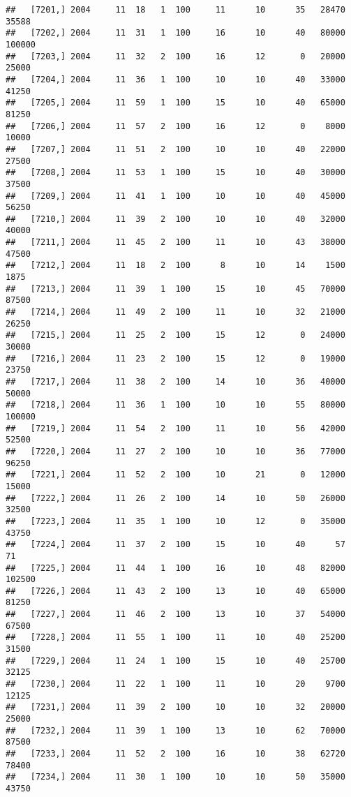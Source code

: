 \documentclass{article}\usepackage[]{graphicx}\usepackage[]{color}
\makeatletter
\newenvironment{kframe}{%
 \def\at@end@of@kframe{}%
 \ifinner\ifhmode%
  \def\at@end@of@kframe{\end{minipage}}%
  \begin{minipage}{\columnwidth}%
 \fi\fi%
 \def\FrameCommand##1{\hskip\@totalleftmargin \hskip-\fboxsep
 \colorbox{shadecolor}{##1}\hskip-\fboxsep
     \hskip-\linewidth \hskip-\@totalleftmargin \hskip\columnwidth}%
 \MakeFramed {\advance\hsize-\width
   \@totalleftmargin\z@ \linewidth\hsize
   \@setminipage}}%
 {\par\unskip\endMakeFramed%
 \at@end@of@kframe}
\newenvironment{knitrout}{}{} %
\makeatother
\begin{document}
\begin{knitrout}
\begin{kframe}
\begin{verbatim}
##   [7201,] 2004     11  18   1  100     11      10      35   28470   35588
##   [7202,] 2004     11  31   1  100     16      10      40   80000  100000
##   [7203,] 2004     11  32   2  100     16      12       0   20000   25000
##   [7204,] 2004     11  36   1  100     10      10      40   33000   41250
##   [7205,] 2004     11  59   1  100     15      10      40   65000   81250
##   [7206,] 2004     11  57   2  100     16      12       0    8000   10000
##   [7207,] 2004     11  51   2  100     10      10      40   22000   27500
##   [7208,] 2004     11  53   1  100     15      10      40   30000   37500
##   [7209,] 2004     11  41   1  100     10      10      40   45000   56250
##   [7210,] 2004     11  39   2  100     10      10      40   32000   40000
##   [7211,] 2004     11  45   2  100     11      10      43   38000   47500
##   [7212,] 2004     11  18   2  100      8      10      14    1500    1875
##   [7213,] 2004     11  39   1  100     15      10      45   70000   87500
##   [7214,] 2004     11  49   2  100     11      10      32   21000   26250
##   [7215,] 2004     11  25   2  100     15      12       0   24000   30000
##   [7216,] 2004     11  23   2  100     15      12       0   19000   23750
##   [7217,] 2004     11  38   2  100     14      10      36   40000   50000
##   [7218,] 2004     11  36   1  100     10      10      55   80000  100000
##   [7219,] 2004     11  54   2  100     11      10      56   42000   52500
##   [7220,] 2004     11  27   2  100     10      10      36   77000   96250
##   [7221,] 2004     11  52   2  100     10      21       0   12000   15000
##   [7222,] 2004     11  26   2  100     14      10      50   26000   32500
##   [7223,] 2004     11  35   1  100     10      12       0   35000   43750
##   [7224,] 2004     11  37   2  100     15      10      40      57      71
##   [7225,] 2004     11  44   1  100     16      10      48   82000  102500
##   [7226,] 2004     11  43   2  100     13      10      40   65000   81250
##   [7227,] 2004     11  46   2  100     13      10      37   54000   67500
##   [7228,] 2004     11  55   1  100     11      10      40   25200   31500
##   [7229,] 2004     11  24   1  100     15      10      40   25700   32125
##   [7230,] 2004     11  22   1  100     11      10      20    9700   12125
##   [7231,] 2004     11  39   2  100     10      10      32   20000   25000
##   [7232,] 2004     11  39   1  100     13      10      62   70000   87500
##   [7233,] 2004     11  52   2  100     16      10      38   62720   78400
##   [7234,] 2004     11  30   1  100     10      10      50   35000   43750

\end{verbatim}
\end{kframe}
\end{knitrout}
\end{document}
